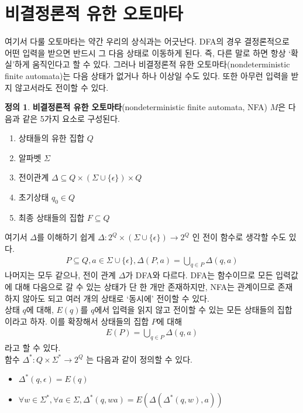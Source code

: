 \documentclass[b5paper, 11pt]{book}
\theoremstyle{definition}
\newtheorem{defn}{정의}[chapter]
\begin{document}
\section{비결정론적 유한 오토마타}
여기서 다룰 오토마타는 약간 우리의 상식과는 어긋난다. DFA의 경우 결정론적으로 어떤 입력을 받으면 반드시 그 다음 상태로 이동하게 된다. 즉, 다른 말로 하면 항상 `확실'하게 움직인다고 할 수 있다. 그러나 비결정론적 유한 오토마타(nondeterministic finite automata)는 다음 상태가 없거나 하나 이상일 수도 있다. 또한 아무런 입력을 받지 않고서라도 전이할 수 있다.
\begin{defn}
    \textbf{비결정론적 유한 오토마타}(nondeterministic finite automata, NFA) $M$은 다음과 같은 5가지 요소로 구성된다.
\begin{enumerate}
    \item 상태들의 유한 집합 $Q$
    \item 알파벳 $\Sigma$
    \item 전이관계 $\Delta \subseteq Q \times (\Sigma \cup \{\epsilon\}) \times Q$
    \item 초기상태 $q_0 \in Q$
    \item 최종 상태들의 집합 $F \subseteq Q$
\end{enumerate}
\end{defn}
여기서 $\Delta$를 이해하기 쉽게 $\Delta: 2^Q 
\times (\Sigma \cup \{\epsilon\}) \rightarrow 2^{Q}$ 인 전이 함수로 생각할 수도 있다.
\begin{align*}
    P \subseteq Q, a\in \Sigma \cup \{\epsilon\}, \Delta(P, a) = \bigcup_{q\in P}\Delta (q, a)
\end{align*}
나머지는 모두 같으나, 전이 관계 $\Delta$가 DFA와 다르다. DFA는 함수이므로 모든 입력값에 대해 다음으로 갈 수 있는 상태가 단 한 개만 존재하지만, NFA는 관계이므로 존재하지 않아도 되고 여러 개의 상태로 `동시에' 전이할 수 있다.\\
상태 $q$에 대해, $E(q)$를 $q$에서 입력을 읽지 않고 전이할 수 있는 모든 상태들의 집합이라고 하자. 이를 확장해서 상태들의 집합 $P$에 대해 
\begin{align*}
    E(P) = \bigcup_{q\in P} \Delta(q, a)
\end{align*}
라고 할 수 있다. \\
함수 $\Delta^*: Q \times \Sigma^* \rightarrow 2^{Q} $ 는 다음과 같이 정의할 수 있다. 
\begin{itemize}
    \item $\Delta^* (q, \epsilon) = E(q)$
    \item $\forall w \in \Sigma^* ,  \forall a \in \Sigma, \Delta^* (q, wa) = E(\Delta(\Delta^*(q, w), a))$
\end{itemize}
\end{document}
